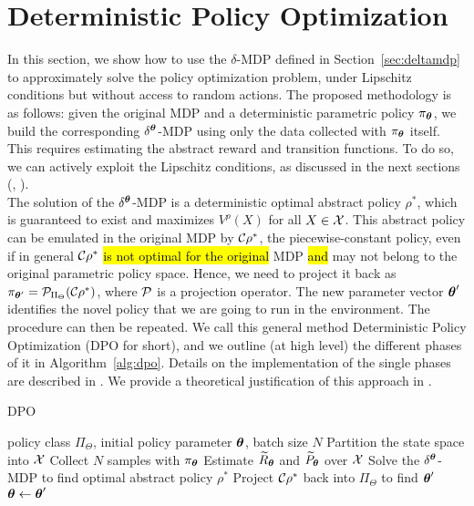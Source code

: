\section{Deterministic Policy Optimization}\label{sec:algo}
In this section, we show how to use the $\delta$-\ac{MDP} defined in Section~\ref{sec:deltamdp} to approximately solve the policy optimization problem, under Lipschitz conditions but without access to random actions.
%
The proposed methodology is as follows: given the original \ac{MDP} and a deterministic parametric policy $\pi_{\boldsymbol{\theta}}$, we build the corresponding  $\delta^{\boldsymbol{\theta}}$-\ac{MDP} using only the data collected with $\pi_{\boldsymbol{\theta}}$ itself. This requires estimating the abstract reward and transition functions. To do so, we can actively exploit the Lipschitz conditions, as discussed in the next sections (, ).\\
\newline
The solution of the $\delta^{\boldsymbol{\theta}}$-\ac{MDP} is a deterministic optimal abstract policy $\rho^{*}$, which is guaranteed to exist and maximizes $V^{\rho}(X)$ for all $X\in\mathcal{X}$. This abstract policy can be emulated in the original \ac{MDP} by $\mathcal{C}\rho^{*}$, the piecewise-constant policy, even if in general $\mathcal{C}\rho^{*}$ \hl{is not optimal for the original} \ac{MDP} \hl{and} may not belong to the original parametric policy space. Hence, we need to project it back as $\pi_{\boldsymbol{\theta}'} = \mathcal{P}_{\Pi_{\Theta}}(\mathcal{C}\rho^{*})$, where $\mathcal{P}$ is a projection operator. The new parameter vector $\boldsymbol{\theta}'$ identifies the novel policy that we are going to run in the environment. The procedure can then be repeated. We call this general method Deterministic Policy Optimization (\ac{DPO} for short), and we outline (at high level) the different phases of it in Algorithm~\ref{alg:dpo}. Details on the implementation of the single phases are described in .
We provide a theoretical justification of this approach in .
%
%
\begin{algorithm}[t]
	\caption{DPO}
	\label{alg:dpo}
	\begin{algorithmic}[1]
		 policy class $\Pi_{\Theta}$, initial policy parameter $\boldsymbol{\theta}$, batch size $N$
		\STATE Partition the state space into $\mathcal{X}$
		\STATE Collect $N$ samples with $\pi_{\boldsymbol{\theta}}$ 
		\STATE Estimate $\widetilde{R}_{\boldsymbol{\theta}}$ and $\widetilde{P}_{\boldsymbol{\theta}}$ over $\mathcal{X}$
		\STATE Solve the $\delta^{\boldsymbol{\theta}}$-MDP to find optimal abstract policy $\rho^{*}$
		\STATE Project $\mathcal{C}\rho^{*}$ back into $\Pi_{\Theta}$ to find $\boldsymbol{\theta}'$
		\STATE $\boldsymbol{\theta}\gets\boldsymbol{\theta}'$
		\ENDFOR
	\end{algorithmic}
\end{algorithm}
%

